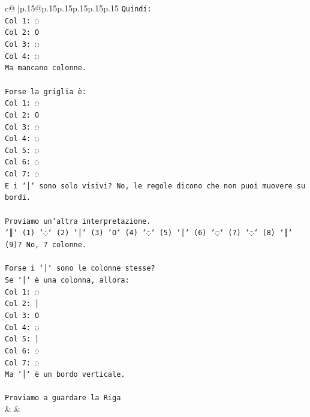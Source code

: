 \documentclass{article}
\begin{document}
{\begin{supertabular}{c@{$\;$}|p{.15\linewidth}@{}p{.15\linewidth}p{.15\linewidth}p{.15\linewidth}p{.15\linewidth}p{.15\linewidth}}
{{{\texttt{Quindi:} \\
\texttt{Col 1: ◌} \\
\texttt{Col 2: O} \\
\texttt{Col 3: ◌} \\
\texttt{Col 4: ◌} \\
\texttt{Ma mancano colonne.} \\
\\ 
\texttt{Forse la griglia è:} \\
\texttt{Col 1: ◌} \\
\texttt{Col 2: O} \\
\texttt{Col 3: ◌} \\
\texttt{Col 4: ◌} \\
\texttt{Col 5: ◌} \\
\texttt{Col 6: ◌} \\
\texttt{Col 7: ◌} \\
\texttt{E i `│` sono solo visivi? No, le regole dicono che non puoi muovere su bordi.} \\
\\ 
\texttt{Proviamo un'altra interpretazione.} \\
\texttt{`║` (1) `◌` (2) `│` (3) `O` (4) `◌` (5) `│` (6) `◌` (7) `◌` (8) `║` (9)? No, 7 colonne.} \\
\\ 
\texttt{Forse i `│` sono le colonne stesse?} \\
\texttt{Se `│` è una colonna, allora:} \\
\texttt{Col 1: ◌} \\
\texttt{Col 2: │} \\
\texttt{Col 3: O} \\
\texttt{Col 4: ◌} \\
\texttt{Col 5: │} \\
\texttt{Col 6: ◌} \\
\texttt{Col 7: ◌} \\
\texttt{Ma `│` è un bordo verticale.} \\
\\ 
\texttt{Proviamo a guardare la Riga} \\
            }
        }
    }
    & & \\ \\


\end{supertabular}}
\end{document}
